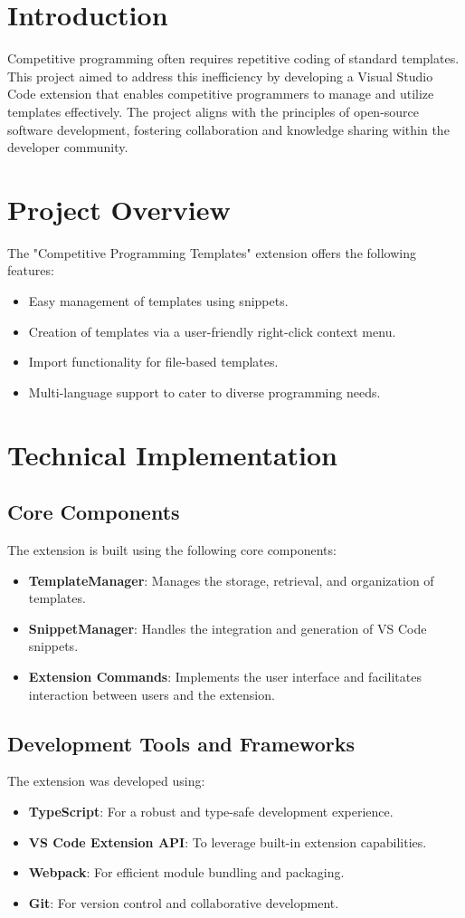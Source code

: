 \documentclass{article}
\begin{document}
\section{Introduction}
Competitive programming often requires repetitive coding of standard templates. This project aimed to address this inefficiency by developing a Visual Studio Code extension that enables competitive programmers to manage and utilize templates effectively. The project aligns with the principles of open-source software development, fostering collaboration and knowledge sharing within the developer community.

\section{Project Overview}
The "Competitive Programming Templates" extension offers the following features:
\begin{itemize}
    \item Easy management of templates using snippets.
    \item Creation of templates via a user-friendly right-click context menu.
    \item Import functionality for file-based templates.
    \item Multi-language support to cater to diverse programming needs.
\end{itemize}

\section{Technical Implementation}
\subsection{Core Components}
The extension is built using the following core components:
\begin{itemize}
    \item \textbf{TemplateManager}: Manages the storage, retrieval, and organization of templates.
    \item \textbf{SnippetManager}: Handles the integration and generation of VS Code snippets.
    \item \textbf{Extension Commands}: Implements the user interface and facilitates interaction between users and the extension.
\end{itemize}

\subsection{Development Tools and Frameworks}
The extension was developed using:
\begin{itemize}
    \item \textbf{TypeScript}: For a robust and type-safe development experience.
    \item \textbf{VS Code Extension API}: To leverage built-in extension capabilities.
    \item \textbf{Webpack}: For efficient module bundling and packaging.
    \item \textbf{Git}: For version control and collaborative development.
\end{itemize}
\end{document}
